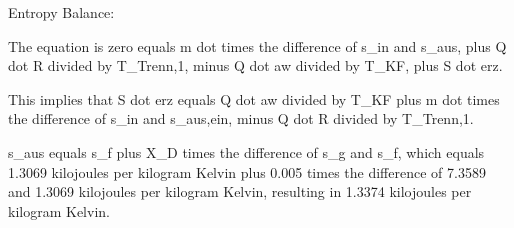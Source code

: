 Entropy Balance:

The equation is zero equals m dot times the difference of s_in and s_aus, plus Q dot R divided by T_Trenn,1, minus Q dot aw divided by T_KF, plus S dot erz.

This implies that S dot erz equals Q dot aw divided by T_KF plus m dot times the difference of s_in and s_aus,ein, minus Q dot R divided by T_Trenn,1.

s_aus equals s_f plus X_D times the difference of s_g and s_f, which equals 1.3069 kilojoules per kilogram Kelvin plus 0.005 times the difference of 7.3589 and 1.3069 kilojoules per kilogram Kelvin, resulting in 1.3374 kilojoules per kilogram Kelvin.